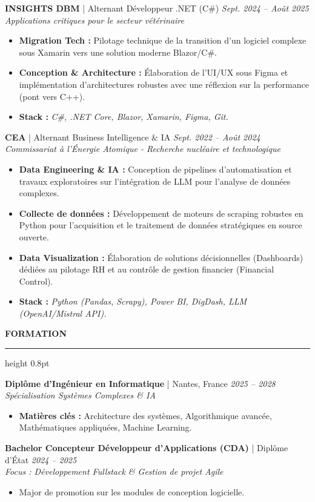 \documentclass[10pt,a4paper,sans]{article}
\newcommand{\sectiontitle}[1]{%
    \vspace{6pt} %
    {\large\bfseries\color{primary}\uppercase{#1}} %
    \par\vspace{2pt}
    \hrule height 0.8pt
    \par\vspace{5pt} %
}
\newcommand{\experience}[4]{%
    \textbf{#1} | #2 \hfill \textit{#3} \\
    \textit{#4} \vspace{2pt}
}
\begin{document}
\experience{INSIGHTS DBM}{Alternant Développeur .NET (C\#)}{Sept. 2024 -- Août 2025}{Applications critiques pour le secteur vétérinaire}
\begin{itemize}[noitemsep, topsep=2pt]
    \item \textbf{Migration Tech :} Pilotage technique de la transition d'un logiciel complexe sous Xamarin vers une solution moderne Blazor/C\#.
    \item \textbf{Conception \& Architecture :} Élaboration de l'UI/UX sous Figma et implémentation d'architectures robustes avec une réflexion sur la performance (pont vers C++).
    \item \textbf{Stack :} \textit{C\#, .NET Core, Blazor, Xamarin, Figma, Git.}
\end{itemize}

\experience{CEA}{Alternant Business Intelligence \& IA}{Sept. 2022 -- Août 2024}{Commissariat à l'Énergie Atomique - Recherche nucléaire et technologique}
\begin{itemize}[noitemsep, topsep=2pt]
    \item \textbf{Data Engineering \& IA :} Conception de pipelines d'automatisation et travaux exploratoires sur l'intégration de LLM pour l'analyse de données complexes.
    \item \textbf{Collecte de données :} Développement de moteurs de scraping robustes en Python pour l'acquisition et le traitement de données stratégiques en source ouverte.
    \item \textbf{Data Visualization :} Élaboration de solutions décisionnelles (Dashboards) dédiées au pilotage RH et au contrôle de gestion financier (Financial Control).
    \item \textbf{Stack :} \textit{Python (Pandas, Scrapy), Power BI, DigDash, LLM (OpenAI/Mistral API).}
\end{itemize}

\sectiontitle{Formation}

\experience{Diplôme d'Ingénieur en Informatique}{Nantes, France}{2025 -- 2028}{Spécialisation Systèmes Complexes \& IA}
\begin{itemize}[noitemsep, topsep=0pt]
    \item \textbf{Matières clés :} Architecture des systèmes, Algorithmique avancée, Mathématiques appliquées, Machine Learning.
\end{itemize}

\experience{Bachelor Concepteur Développeur d'Applications (CDA)}{Diplôme d'État}{2024 -- 2025}{Focus : Développement Fullstack \& Gestion de projet Agile}
\begin{itemize}[noitemsep, topsep=0pt]
    \item Major de promotion sur les modules de conception logicielle.
\end{itemize}
\end{document}
